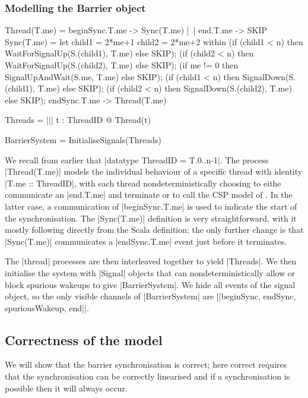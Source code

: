 \subsubsection{Modelling the Barrier object}
\inlineCSP
\begin{cspm}
  Thread(T.me) = beginSync.T.me -> Sync(T.me) |~| end.T.me -> SKIP
  Sync(T.me) = 
    let child1 = 2*me+1 
        child2 = 2*me+2
    within 
        (if (child1 < n) then WaitForSignalUp(S.(child1), T.me) else SKIP);
        (if (child2 < n) then WaitForSignalUp(S.(child2), T.me) else SKIP);
        (if me != 0 then SignalUpAndWait(S.me, T.me) else SKIP);
        (if (child1 < n) then SignalDown(S.(child1), T.me) else SKIP);
        (if (child2 < n) then SignalDown(S.(child2), T.me) else SKIP);
        endSync.T.me -> Thread(T.me)


  Threads = ||| t : ThreadID @ Thread(t)

  BarrierSystem = InitialiseSignals(Threads)
\end{cspm}

We recall from earlier that |datatype ThreadID = T.{0..n-1}|. The process |Thread(T.me)| models the individual behaviour of a specific thread with identity |T.me :: ThreadID|, with each thread nondeterministically choosing to eithe communicate an |end.T.me| and terminate or to call the CSP model of . In the latter case, a communication of |beginSync.T.me| is used to indicate the start of the synchronisation. The |Sync(T.me)| definition is very straightforward, with it mostly following directly from the Scala definition; the only further change is that |Sync(T.me)| communicates a |endSync.T.me| event just before it terminates.

The |thread| processes are then interleaved together to yield |Threads|. We then initialise the system with |Signal| objects that can nondeterministically allow or block spurious wakeups to give |BarrierSystem|. We hide all events of the signal object, so the only visible channels of |BarrierSystem| are |{|beginSync, endSync, spuriousWakeup, end|}|.

\subsection{Correctness of the model}

We will show that the barrier synchronisation is correct; here correct requires that the synchronisation can be correctly linearised and if a synchronisation is possible then it will always occur. 

